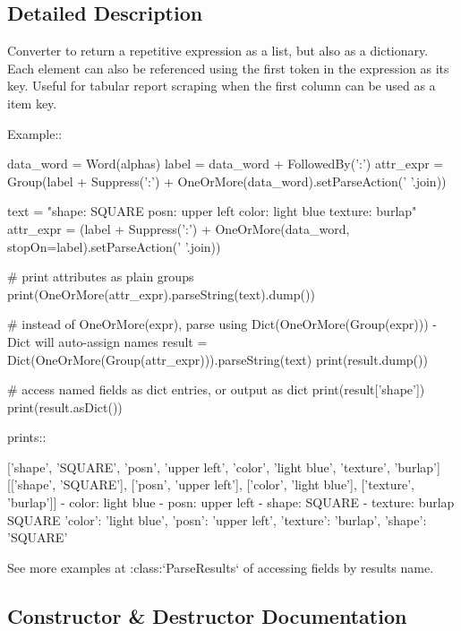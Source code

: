\subsection{Detailed Description}
\begin{DoxyVerb}Converter to return a repetitive expression as a list, but also
as a dictionary. Each element can also be referenced using the first
token in the expression as its key. Useful for tabular report
scraping when the first column can be used as a item key.

Example::

    data_word = Word(alphas)
    label = data_word + FollowedBy(':')
    attr_expr = Group(label + Suppress(':') + OneOrMore(data_word).setParseAction(' '.join))

    text = "shape: SQUARE posn: upper left color: light blue texture: burlap"
    attr_expr = (label + Suppress(':') + OneOrMore(data_word, stopOn=label).setParseAction(' '.join))

    # print attributes as plain groups
    print(OneOrMore(attr_expr).parseString(text).dump())

    # instead of OneOrMore(expr), parse using Dict(OneOrMore(Group(expr))) - Dict will auto-assign names
    result = Dict(OneOrMore(Group(attr_expr))).parseString(text)
    print(result.dump())

    # access named fields as dict entries, or output as dict
    print(result['shape'])
    print(result.asDict())

prints::

    ['shape', 'SQUARE', 'posn', 'upper left', 'color', 'light blue', 'texture', 'burlap']
    [['shape', 'SQUARE'], ['posn', 'upper left'], ['color', 'light blue'], ['texture', 'burlap']]
    - color: light blue
    - posn: upper left
    - shape: SQUARE
    - texture: burlap
    SQUARE
    {'color': 'light blue', 'posn': 'upper left', 'texture': 'burlap', 'shape': 'SQUARE'}

See more examples at :class:`ParseResults` of accessing fields by results name.
\end{DoxyVerb}
 

\subsection{Constructor \& Destructor Documentation}
\mbox{\label{classpyparsing_1_1Dict_a4cbaea3fc512cb5ddfd608a671f62481}} 
